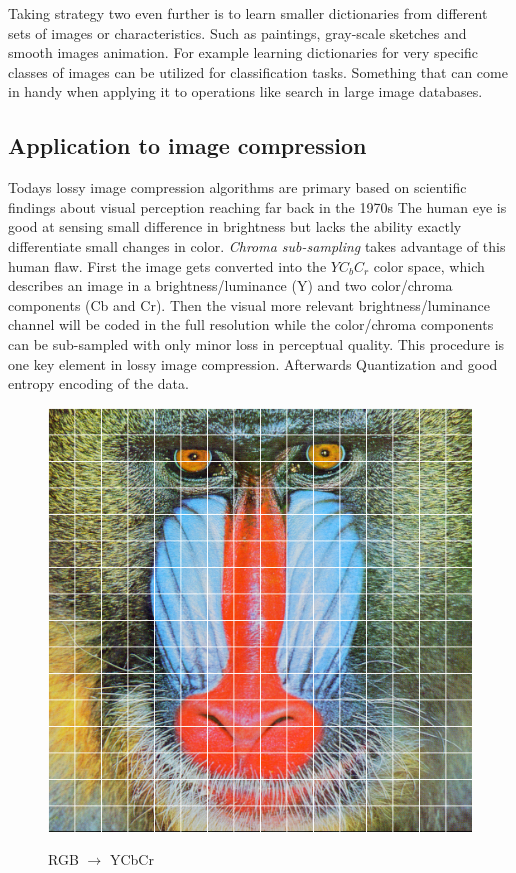 Taking strategy two even further is to learn smaller dictionaries from different
sets of images or characteristics. Such as paintings, gray-scale sketches and
smooth images animation. For example learning dictionaries for very specific
classes of images can be utilized for classification tasks. Something that can
come in handy when applying it to operations like search in large image
databases.


\subsection{Application to image compression}
\label{sec:compression}
Todays lossy image compression algorithms are primary based on scientific
findings about visual perception reaching far back in the 1970s\cite{?}
The human eye is good at sensing small difference in brightness but lacks the
ability exactly differentiate small changes in color. \emph{Chroma sub-sampling}
takes advantage of this human flaw. First the image gets converted into the
$YC_bC_r$ color space, which describes an image in a brightness/luminance (Y)
and two color/chroma components (Cb and Cr). Then the visual more relevant
brightness/luminance channel will be coded in the full resolution while the
color/chroma components can be sub-sampled with only minor loss in perceptual
quality. This procedure
is one key element in lossy image compression. 
Afterwards 
Quantization and good entropy encoding of the data.
\begin{figure}[h]
\centering
\includegraphics[scale = 0.25]{images/segmentation.png}
\label{fig:YCbCr}
\caption{RGB $\rightarrow$ YCbCr}
\end{figure}
